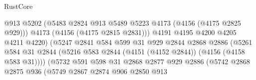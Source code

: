 \begin{lexlean}{RustCore}
\begin{coremodule}
                                          @913
                                          @5202
                                          (@5483
                                            @2824
                                            @913
                                            @5489
                                            @5223
                                            @4173
                                            (@4156 (@4175 @2825 @929)))
                                          @4173
                                          (@4156 (@4175 @2815 @2831)))
                                        @4191
                                        @4195
                                        @4200
                                        @4205
                                        @4211
                                        @4220)
                                      (@5247
                                        @2841
                                        @584
                                        @599
                                        @31
                                        @929
                                        @2844
                                        @2868
                                        @2886
                                        (@5261
                                          @584
                                          @31
                                          @2844
                                          (@5216
                                            @583
                                            @2844
                                            (@4151 (@4152 @2844))
                                            (@4156 (@4158 @583 @31))))
                                        (@5732
                                          @591
                                          @598
                                          @31
                                          @2868
                                          @2877
                                          @929
                                          @2886
                                          (@5742
                                            @2868
                                            @2875
                                            @936
                                            (@5749
                                              @2867
                                              @2874
                                              @906
                                              @2850
                                              @913

\end{coremodule}
\end{lexlean}
